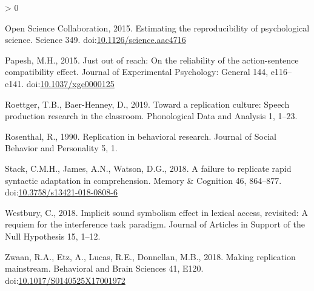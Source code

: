 \documentclass[]{elsarticle} %
\newlength{\cslhangindent}
\newenvironment{CSLReferences}[2] %
 {%
  \setlength{\parindent}{0pt}
  \ifodd #1 \everypar{\setlength{\hangindent}{\cslhangindent}}\ignorespaces\fi
  \ifnum #2 > 0
  \setlength{\parskip}{#2\baselineskip}
  \fi
 }%
 {}
\begin{document}
\begin{CSLReferences}{1}{0}
\leavevmode\hypertarget{ref-open_science_collaboration_estimating_2015}{}%
Open Science Collaboration, 2015. Estimating the reproducibility of
psychological science. Science 349.
doi:\href{https://doi.org/10.1126/science.aac4716}{10.1126/science.aac4716}

\leavevmode\hypertarget{ref-papesh_just_2015}{}%
Papesh, M.H., 2015. Just out of reach: {On} the reliability of the
action-sentence compatibility effect. Journal of Experimental
Psychology: General 144, e116--e141.
doi:\href{https://doi.org/10.1037/xge0000125}{10.1037/xge0000125}

\leavevmode\hypertarget{ref-roettger_toward_2019}{}%
Roettger, T.B., Baer-Henney, D., 2019. Toward a replication culture:
{Speech} production research in the classroom. Phonological Data and
Analysis 1, 1--23.

\leavevmode\hypertarget{ref-rosenthal_replication_1990}{}%
Rosenthal, R., 1990. Replication in behavioral research. Journal of
Social Behavior and Personality 5, 1.

\leavevmode\hypertarget{ref-stack_failure_2018}{}%
Stack, C.M.H., James, A.N., Watson, D.G., 2018. A failure to replicate
rapid syntactic adaptation in comprehension. Memory \& Cognition 46,
864--877.
doi:\href{https://doi.org/10.3758/s13421-018-0808-6}{10.3758/s13421-018-0808-6}

\leavevmode\hypertarget{ref-westbury_implicit_2018}{}%
Westbury, C., 2018. Implicit sound symbolism effect in lexical access,
revisited: {A} requiem for the interference task paradigm. Journal of
Articles in Support of the Null Hypothesis 15, 1--12.

\leavevmode\hypertarget{ref-zwaan_making_2018}{}%
Zwaan, R.A., Etz, A., Lucas, R.E., Donnellan, M.B., 2018. Making
replication mainstream. Behavioral and Brain Sciences 41, E120.
doi:\href{https://doi.org/10.1017/S0140525X17001972}{10.1017/S0140525X17001972}

\end{CSLReferences}
\end{document}
